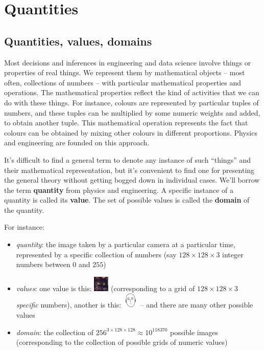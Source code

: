 \documentclass[
  a4paper,
  DIV=11,
  numbers=noendperiod,
  oneside]{scrreprt}
\providecommand{\tightlist}{%
  \setlength{\itemsep}{0pt}\setlength{\parskip}{0pt}}\usepackage{longtable,booktabs,array}
\begin{document}
\providecommand*{\mo}[1][=]{\mathord{\,#1\,}}
\providecommand*{\yX}{\se{X}}
\providecommand*{\yY}{\se{Y}}
\providecommand*{\yI}{\se{I}}
\providecommand{\di}{\mathrm{d}}

\hypertarget{quantities}{%
\section{Quantities}\label{quantities}}

\hypertarget{sec-quant-value-dom}{%
\subsection{Quantities, values, domains}\label{sec-quant-value-dom}}

Most decisions and inferences in engineering and data science involve
things or properties of real things. We represent them by mathematical
objects -- most often, collections of numbers -- with particular
mathematical properties and operations. The mathematical properties
reflect the kind of activities that we can do with these things. For
instance, colours are represented by particular tuples of numbers, and
these tuples can be multiplied by some numeric weights and added, to
obtain another tuple. This mathematical operation represents the fact
that colours can be obtained by mixing other colours in different
proportions. Physics and engineering are founded on this approach.

It's difficult to find a general term to denote any instance of such
``things'' and their mathematical representation, but it's convenient to
find one for presenting the general theory without getting bogged down
in individual cases. We'll borrow the term {\textbf{quantity}} from
physics and engineering. A specific instance of a quantity is called its
{\textbf{value}}. The set of possible values is called the
{\textbf{domain}} of the quantity.

For instance:

\begin{itemize}
\tightlist
\item
  \emph{quantity}: the image taken by a particular camera at a
  particular time, represented by a specific collection of numbers (say
  \(128\times128\times3\) integer numbers between \(0\) and \(255\))
\item
  \emph{values}: one value is this:
  \includegraphics[width=2em,height=\textheight]{cat_image.png}
  (corresponding to a grid of \(128\times128\times3\) \emph{specific}
  numbers), another is this:
  \includegraphics[width=2em,height=\textheight]{saitama_image.png} --
  and there are many other possible values
\item
  \emph{domain}: the collection of
  \(256^{3\times128\times128} \approx 10^{118 370}\) possible images
  (corresponding to the collection of possible grids of numeric values)
\end{itemize}
\end{document}
